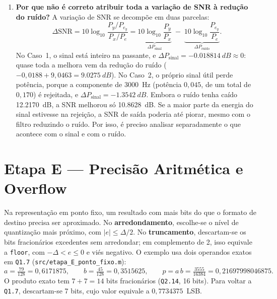 \documentclass[11pt,a4paper]{article}
\newcommand{\MetricaEProdCompleto}{0{,}21697998046875}
\begin{document}
\begin{enumerate}[leftmargin=1.6em, itemsep=3pt]
    \item \textbf{Por que não é correto atribuir toda a variação de SNR à redução do ruído?}
    A variação de SNR se decompõe em duas parcelas:
    \begin{equation}
        \Delta\text{SNR} = 10\log_{10}\frac{P_y/P_{e_y}}{P_x/P_e} = \underbrace{10\log_{10}\frac{P_y}{P_x}}_{\Delta P_{\text{sinal}}} \;-\; \underbrace{10\log_{10}\frac{P_{e_y}}{P_e}}_{\Delta P_{\text{ruído}}}.
        \label{eq:deltasnr}
    \end{equation}
    No Caso~1, o sinal está inteiro na passante, e $\Delta P_{\text{sinal}} = \SI{-0,018814}{dB} \approx 0$: quase toda a melhora vem da redução do ruído ($-0,0188 + 9,0463 = \SI{9,0275}{dB}$). No Caso~2, o próprio sinal útil perde potência, porque a componente de \SI{3000}{Hz} (potência $0,045$, de um total de $0,170$) é rejeitada, e $\Delta P_{\text{sinal}} = \SI{-1,3542}{dB}$. Embora o ruído tenha caído \SI{12,2170}{dB}, a SNR melhorou só \SI{10,8628}{dB}. Se a maior parte da energia do sinal estivesse na rejeição, a SNR de saída poderia até piorar, mesmo com o filtro reduzindo o ruído. Por isso, é preciso analisar separadamente o que acontece com o sinal e com o ruído.
\end{enumerate}

\section{Etapa E — Precisão Aritmética e Overflow}

Na representação em ponto fixo, um resultado com mais bits do que o formato de destino precisa ser aproximado. No \textbf{arredondamento}, escolhe-se o nível de quantização mais próximo, com $|e| \le \Delta/2$. No \textbf{truncamento}, descartam-se os bits fracionários excedentes sem arredondar; em complemento de 2, isso equivale a \texttt{floor}, com $-\Delta < e \le 0$ e viés negativo. O exemplo usa dois operandos exatos em \texttt{Q1.7} (\texttt{src/etapa\_E\_ponto\_fixo.m}):
\begin{equation}
    a = \tfrac{79}{128} = 0,6171875, \qquad b = \tfrac{45}{128} = 0,3515625, \qquad p = a\,b = \tfrac{3555}{16384} = \MetricaEProdCompleto .
\end{equation}
O produto exato tem $7 + 7 = 14$ bits fracionários (\texttt{Q2.14}, 16 bits). Para voltar a \texttt{Q1.7}, descartam-se 7 bits, cujo valor equivale a $0,7734375$~LSB.
\end{document}
